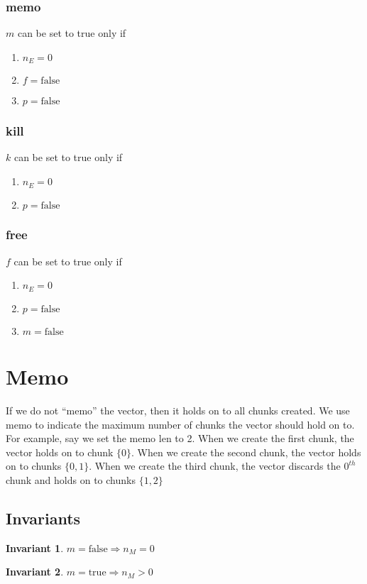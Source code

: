 \documentclass[letterpaper,12pt]{article}
\newtheorem{invariant}{Invariant}
\newcommand{\be}{\begin{enumerate}}
\newcommand{\ee}{\end{enumerate}}
\begin{document}
\subsubsection{memo}
\label{memo_change}
\(m\) can be set to true only if 
\be
\item \(n_E = 0\)
\item \(f = \mathrm{false}\)
\item \(p = \mathrm{false}\)
\ee
\subsubsection{kill}
\label{kill_change}
\(k\) can be set to true only if 
\be
\item \(n_E = 0\)
\item \(p = \mathrm{false}\)
\ee

\subsubsection{free}
\label{free_change}

\(f\) can be set to true only if 
\be
\item \(n_E = 0\)
\item \(p = \mathrm{false}\)
\item \(m = \mathrm{false}\)
\ee
\section{Memo}
\label{memo}

If we do not ``memo'' the vector, then it holds on to all chunks created.
We use memo to indicate the maximum number of chunks the vector should hold on
to. For example, say we set the memo len to 2. 
When we create the first chunk, the vector holds on to chunk \(\{0\}\). 
When we create the second chunk, the vector holds on to chunks \(\{0, 1\}\).
When we create the third chunk, the vector discards the \(0^{th}\) chunk and
holds on to chunks \(\{1, 2\}\)


\subsection{Invariants}
\begin{invariant}
\label{m_1}
\(m = \mathrm{false} \Rightarrow n_M = 0\)
\end{invariant}

\begin{invariant}
\label{m_2}
\(m = \mathrm{true} \Rightarrow n_M > 0\)
\end{invariant}
\end{document}
